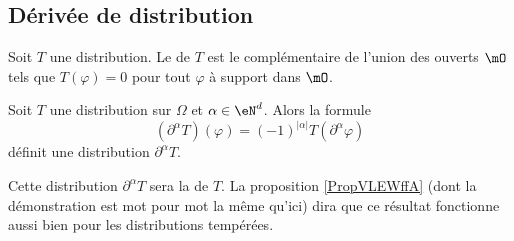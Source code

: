 \subsection{Dérivée de distribution}

\begin{definition}
    Soit \( T\) une distribution. Le  de \( T\) est le complémentaire de l'union des ouverts \( \mO\) tels que \( T(\varphi)=0\) pour tout \( \varphi\) à support dans \( \mO\).
\end{definition}


\begin{proposition} \label{PropKJLrfSX}
    Soit \( T\) une distribution sur \( \Omega\) et \( \alpha\in \eN^d\). Alors la formule
    \begin{equation}
        (\partial^{\alpha}T)(\varphi)=(-1)^{| \alpha |}T(\partial^{\alpha}\varphi)
    \end{equation}
    définit une distribution \( \partial^{\alpha}T\).
\end{proposition}
Cette distribution \( \partial^{\alpha}T\) sera la  de \( T\). La proposition \ref{PropVLEWffA} (dont la démonstration est mot pour mot la même qu'ici) dira que ce résultat fonctionne aussi bien pour les distributions tempérées.

